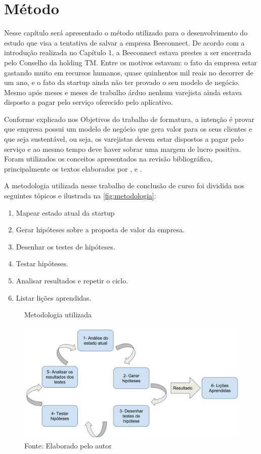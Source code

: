 \chapter[Método]{Método}
\label{chap:metodo}
Nesse capítulo será apresentado o método utilizado para o desenvolvimento do estudo que visa a tentativa de salvar a empresa Beeconnect. De acordo com a introdução realizada no Capítulo 1, a Beeconnect estava prestes a ser encerrada pelo Conselho da holding TM. Entre os motivos estavam: o fato da empresa estar gastando muito em recursos humanos, quase quinhentos mil reais no decorrer de um ano, e o fato da startup ainda não ter provado o seu modelo de negócio. Mesmo após meses e meses de trabalho árduo nenhum varejista ainda estava disposto a pagar pelo serviço oferecido pelo aplicativo.

Conforme explicado nos Objetivos do trabalho de formatura, a intenção é provar que empresa possui um modelo de negócio que gera valor para os seus clientes e que seja sustentável, ou seja, os varejistas devem estar dispostos a pagar pelo serviço e ao mesmo tempo deve haver sobrar uma margem de lucro positiva. Foram utilizados os conceitos apresentados na revisão bibliográfica, principalmente os textos elaborados por ,  e .

A metodologia utilizada nesse trabalho de conclusão de curso foi dividida nos seguintes tópicos e ilustrada na \autoref{fig:metodologia}:
\begin{enumerate}
\item Mapear estado atual da startup
\item Gerar hipóteses sobre a proposta de valor da empresa.
\item Desenhar os testes de hipóteses.
\item Testar hipóteses.
\item Analisar resultados e repetir o ciclo.
\item Listar lições aprendidas.
\end{enumerate}

\begin{figure}[H]
\caption{Metodologia utilizada}
\centerline{\includegraphics[scale=0.25]{img/metodologia}}
\label{fig:metodologia}
\caption* {Fonte: Elaborado pelo autor}
\end{figure}

